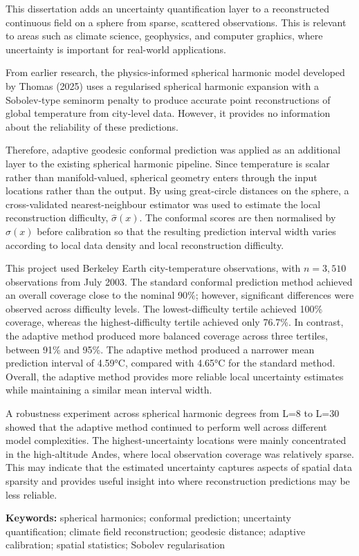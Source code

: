 This dissertation adds an uncertainty quantification layer to a reconstructed continuous field on a sphere from sparse, scattered observations. This is relevant to areas such as climate science, geophysics, and computer graphics, where uncertainty is important for real-world applications.

From earlier research, the physics-informed spherical harmonic model developed by Thomas (2025) uses a regularised spherical harmonic expansion with a Sobolev-type seminorm penalty to produce accurate point reconstructions of global temperature from city-level data. However, it provides no information about the reliability of these predictions. 

Therefore, adaptive geodesic conformal prediction was applied as an additional layer to the existing spherical harmonic pipeline. Since temperature is scalar rather than manifold-valued, spherical geometry enters through the input locations rather than the output. By using great-circle distances on the sphere, a cross-validated nearest-neighbour estimator was used to estimate the local reconstruction difficulty, $\hat{\sigma}(x)$. The conformal scores are then normalised by $\hat{\sigma}(x)$ before calibration so that the resulting prediction interval width varies according to local data density and local reconstruction difficulty.

This project used Berkeley Earth city-temperature observations, with $n=3,510$ observations from July 2003. The standard conformal prediction method achieved an overall coverage close to the nominal 90\%; however, significant differences were observed across difficulty levels. The lowest-difficulty tertile achieved 100\% coverage, whereas the highest-difficulty tertile achieved only 76.7\%. In contrast, the adaptive method produced more balanced coverage across three tertiles, between 91\% and 95\%. The adaptive method produced a narrower mean prediction interval of 4.59°C, compared with 4.65°C for the standard method. Overall, the adaptive method provides more reliable local uncertainty estimates while maintaining a similar mean interval width. 

A robustness experiment across spherical harmonic degrees from L=8 to L=30 showed that the adaptive method continued to perform well across different model complexities. The highest-uncertainty locations were mainly concentrated in the high-altitude Andes, where local observation coverage was relatively sparse. This may indicate that the estimated uncertainty captures aspects of spatial data sparsity and provides useful insight into where reconstruction predictions may be less reliable.

\noindent \textbf{Keywords:} spherical harmonics; conformal prediction; uncertainty quantification; climate field reconstruction; geodesic distance; adaptive calibration; spatial statistics; Sobolev regularisation
